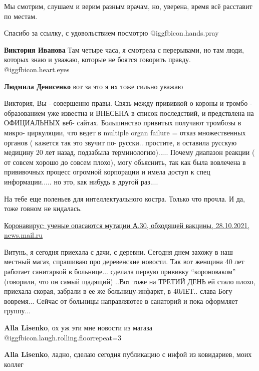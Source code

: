 \begin{itemize}
\begin{itemize}
Мы смотрим, слушаем и верим разным врачам, но, уверена, время всё расставит по
местам.

Спасибо за ссылку, с удовольствием посмотрю  @igg{fbicon.hands.pray} 


\textbf{Виктория Иванова} Там четыре часа, я смотрела с перерывами, но там люди, которых знаю и уважаю, которые не боятся говорить правду.  @igg{fbicon.heart.eyes} 

\textbf{Людмила Денисенко} вот за это я их тоже сильно уважаю
\end{itemize} %


Виктория, Вы - совершенно правы. Связь между прививкой о короны и тромбо -
образованием уже известна и ВНЕСЕНА в список последствий, и предствлена на
ОФИЦИАЛЬНЫХ веб- сайтах. Большинство привитых получают тромбозы в микро-
циркуляции, что ведет в multiple organ failure = отказ множественных органов (
кажется так это звучит по- русски.. простите, я оставила русскую медицину 20
лет назад, подзабыла терминологию)..... Почему диапазон реакции ( от совсем
хорошо до совсем плохо), могу обьяснить, так как была вовлечена в прививочных
процесс огромной корпорации и имела доступ к спец информации..... но это, как
нибудь в другой раз....



На тебе еще поленьев для интеллектуального костра. Только что прочла. И да,
тоже говном не кидалась.

\href{https://news.mail.ru/society/48533184/}{%
Коронавирус: ученые опасаются мутации А.30, обходящей вакцины, 28.10.2021, news.mail.ru%
}


Витунь, я сегодня приехала с дачи, с деревни. Сегодня днем захожу в наш местный
магаз, спрашиваю про деревенские новости. Так вот женщина 40 лет работает
санитаркой в больнице... сделала первую прививку \enquote{короноваком} (говорили, что он
самый щадящий) ..Вот тоже на ТРЕТИЙ ДЕНЬ ей стало плохо, приехала скорая, забрали
в ее же больницу-инфаркт, в 40ЛЕТ.. слава Богу вовремя... Сейчас от больницы
направляютее в санаторий и пока оформляет группу...

\begin{itemize} %
\textbf{Alla Lisenko}, ох уж эти мне новости из магаза  @igg{fbicon.laugh.rolling.floor}{repeat=3} 

\textbf{Alla Lisenko}, ладно, сделаю сегодня публикацию с инфой из ковидариев, моих коллег


\end{itemize}
\end{itemize}
